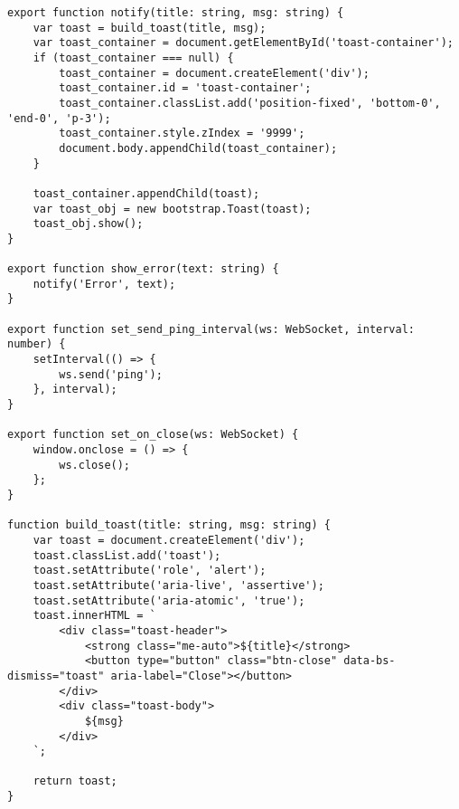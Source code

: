 \begin{lstlisting}[caption={Implementacja funkcjonalnosci notyfikacji oraz WebSocket},label={js:impl},captionpos=b]
export function notify(title: string, msg: string) {
    var toast = build_toast(title, msg);
    var toast_container = document.getElementById('toast-container');
    if (toast_container === null) {
        toast_container = document.createElement('div');
        toast_container.id = 'toast-container';
        toast_container.classList.add('position-fixed', 'bottom-0', 'end-0', 'p-3');
        toast_container.style.zIndex = '9999';
        document.body.appendChild(toast_container);
    }

    toast_container.appendChild(toast);
    var toast_obj = new bootstrap.Toast(toast);
    toast_obj.show();
}

export function show_error(text: string) {
    notify('Error', text);
}

export function set_send_ping_interval(ws: WebSocket, interval: number) {
    setInterval(() => {
        ws.send('ping');
    }, interval);
}

export function set_on_close(ws: WebSocket) {
    window.onclose = () => {
        ws.close();
    };
}

function build_toast(title: string, msg: string) {
    var toast = document.createElement('div');
    toast.classList.add('toast');
    toast.setAttribute('role', 'alert');
    toast.setAttribute('aria-live', 'assertive');
    toast.setAttribute('aria-atomic', 'true');
    toast.innerHTML = `
        <div class="toast-header">
            <strong class="me-auto">${title}</strong>
            <button type="button" class="btn-close" data-bs-dismiss="toast" aria-label="Close"></button>
        </div>
        <div class="toast-body">
            ${msg}
        </div>
    `;

    return toast;
}
\end{lstlisting}

